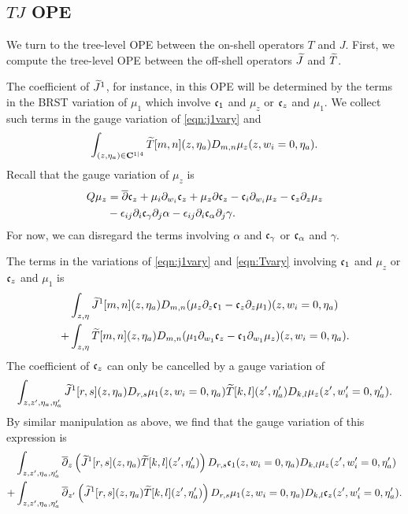 \documentclass[../main.tex]{subfiles}
\begin{document}
\subsection{$TJ$ OPE}

We turn to the tree-level OPE between the on-shell operators $T$ and $J$. 
First, we compute the tree-level OPE between the off-shell operators $\widetilde{J}$ and $\widetilde{T}$. 

The coefficient of $\widetilde{J}^1$, for instance, in this OPE will be determined by the terms in the BRST variation of $\mu_1$ which involve $\mathfrak{c}_1$ and $\mu_z$ or $\mathfrak{c}_z$ and $\mu_1$. 
We collect such terms in the gauge variation of \eqref{eqn:j1vary} and 
\begin{equation}\label{eqn:Tvary}
\int_{(z,\eta_a) \in \mathbf{C}^{1|4}} \widetilde{T} [m,n] (z,\eta_a) D_{m,n} \mu_z(z, w_i=0, \eta_a) .
\end{equation}
Recall that the gauge variation of $\mu_z$ is
\begin{align*}
Q \mu_z & = \overline{\partial} \mathfrak{c}_z + \mu_i \partial_{w_i} \mathfrak{c}_z + \mu_z \partial \mathfrak{c}_z - \mathfrak{c}_i \partial_{w_i} \mu_z - \mathfrak{c}_z \partial_z \mu_z \\
& -\epsilon_{ij} \partial_i \mathfrak{c}_\gamma \partial_j \alpha - \epsilon_{ij} \partial_i \mathfrak{c}_\alpha \partial_j \gamma .
\end{align*}
For now, we can disregard the terms involving $\alpha$ and $\mathfrak{c}_\gamma$ or $\mathfrak{c}_\alpha$ and $\gamma$.

The terms in the variations of \eqref{eqn:j1vary} and \eqref{eqn:Tvary} involving $\mathfrak{c}_1$ and $\mu_z$ or $\mathfrak{c}_z$ and $\mu_1$ is
\begin{align*}
& \int_{z, \eta} \widetilde{J}^1[m,n](z,\eta_a) D_{m,n} (\mu_z \partial_{z} \mathfrak{c}_1 - \mathfrak{c}_z \partial_z \mu_1) (z, w_i=0,\eta_a) \\
+ & \int_{z,\eta} \widetilde{T} [m,n](z,\eta_a) D_{m,n}(\mu_1 \partial_{w_1} \mathfrak{c}_z - \mathfrak{c}_1 \partial_{w_1} \mu_z) (z, w_i=0, \eta_a).
\end{align*}
The coefficient of $\mathfrak{c}_z$ can only be cancelled by a gauge variation of 
\[
\int_{z,z',\eta_a,\eta_a'} \widetilde{J}^1 [r,s] (z,\eta_a) D_{r,s} \mu_1(z,w_i=0,\eta_a) \widetilde{T} [k,l] (z',\eta_a') D_{k,l} \mu_z(z',w_i'=0,\eta_a') .
\]
By similar manipulation as above, we find that the gauge variation of this expression is 
\begin{align*}
& \int_{z,z',\eta_a,\eta_a'} \overline{\partial}_{z} \left(\widetilde{J}^1 [r,s] (z,\eta_a) \widetilde{T}[k,l](z',\eta_a')\right) D_{r,s} \mathfrak{c}_1 (z,w_i=0,\eta_a) D_{k,l} \mu_z (z',w'_i=0,\eta_a') \\
+ & \int_{z,z',\eta_a,\eta_a'} \overline{\partial}_{z'} \left(\widetilde{J}^1 [r,s] (z,\eta_a) \widetilde{T}[k,l](z',\eta_a')\right) D_{r,s} \mu_1 (z,w_i=0,\eta_a) D_{k,l} \mathfrak{c}_z (z',w'_i=0,\eta_a').
\end{align*}
\end{document}
